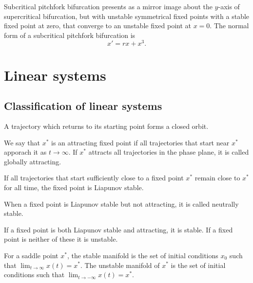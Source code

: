 \documentclass{article}
\begin{document}
\begin{definition}
	Subcritical pitchfork bifurcation presents as a mirror image about the \(y\)-axis of supercritical bifurcation, but with unstable symmetrical fixed points with a stable fixed point at zero, that converge to an unstable fixed point at \(x=0\). The normal form of a subcritical pitchfork bifurcation is
	\begin{equation*}
		x'=rx+x^3.
	\end{equation*}
\end{definition}
\section{Linear systems}
\subsection{Classification of linear systems}
\begin{definition}
	A trajectory which returns to its starting point forms a closed orbit.
\end{definition}
\begin{definition}
	We say that \(x^*\) is an attracting fixed point if all trajectories that start near \(x^*\) apporach it as \(t\rightarrow\infty\). If \(x^*\) attracts all trajectories in the phase plane, it is called globally attracting.
\end{definition}
\begin{definition}
	If all trajectories that start sufficiently close to a fixed point \(x^*\) remain close to \(x^*\) for all time, the fixed point is Liapunov stable.
\end{definition}
\begin{definition}
	When a fixed point is Liapunov stable but not attracting, it is called neutrally stable.
\end{definition}
\begin{definition}
	If a fixed point is both Liapunov stable and attracting, it is stable. If a fixed point is neither of these it is unstable.
\end{definition}
\begin{definition}
	For a saddle point \(x^*\), the stable manifold is the set of initial conditions \(x_0\) such that \(\lim_{t\rightarrow\infty}x(t)=x^*\). The unstable manifold of \(x^*\) is the set of initial conditions such that \(\lim_{t\rightarrow-\infty}x(t)=x^*\).
\end{definition}
\end{document}
